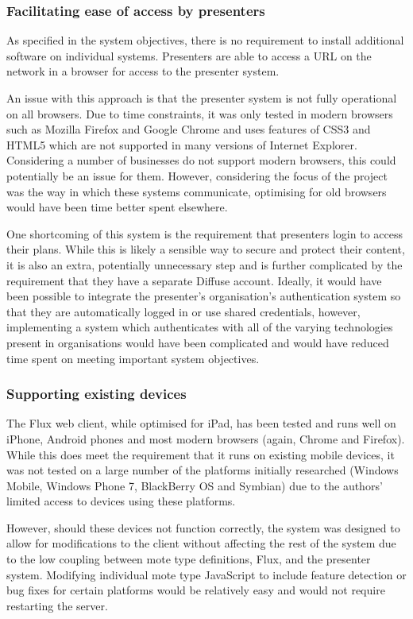 \documentclass[a4papert,11pt,notitlepage]{article}
\begin{document}
\subsubsection{Facilitating ease of access by presenters}
As specified in the system objectives, there is no requirement to install additional software on individual systems. Presenters are able to access a URL on the network in a browser for access to the presenter system. 

An issue with this approach is that the presenter system is not fully operational on all browsers. Due to time constraints, it was only tested in modern browsers such as Mozilla Firefox and Google Chrome and uses features of CSS3 and HTML5 which are not supported in many versions of Internet Explorer. Considering a number of businesses do not support modern browsers, this could potentially be an issue for them. However, considering the focus of the project was the way in which these systems communicate, optimising for old browsers would have been time better spent elsewhere.

One shortcoming of this system is the requirement that presenters login to access their plans. While this is likely a sensible way to secure and protect their content, it is also an extra, potentially unnecessary step and is further complicated by the requirement that they have a separate Diffuse account. Ideally, it would have been possible to integrate the presenter's organisation's authentication system so that they are automatically logged in or use shared credentials, however, implementing a system which authenticates with all of the varying technologies present in organisations would have been complicated and would have reduced time spent on meeting important system objectives.

\subsubsection{Supporting existing devices}
\label{sec:supportexistingdevices}
The Flux web client, while optimised for iPad, has been tested and runs well on iPhone, Android phones and most modern browsers (again, Chrome and Firefox). While this does meet the requirement that it runs on existing mobile devices, it was not tested on a large number of the platforms initially researched (Windows Mobile, Windows Phone 7, BlackBerry OS and Symbian) due to the authors' limited access to devices using these platforms. 

However, should these devices not function correctly, the system was designed to allow for modifications to the client without affecting the rest of the system due to the low coupling between mote type definitions, Flux, and the presenter system. Modifying individual mote type JavaScript to include feature detection or bug fixes for certain platforms would be relatively easy and would not require restarting the server.
\end{document}
